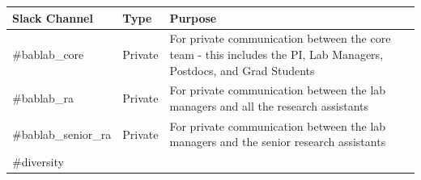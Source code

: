 \documentclass[]{book}
\begin{document}
\begin{longtable}[]{@{}lll@{}}
\toprule
\begin{minipage}[b]{0.18\columnwidth}\raggedright\strut
Slack Channel\strut
\end{minipage} & \begin{minipage}[b]{0.05\columnwidth}\raggedright\strut
Type\strut
\end{minipage} & \begin{minipage}[b]{0.69\columnwidth}\raggedright\strut
Purpose\strut
\end{minipage}\tabularnewline
\midrule
\endhead
\begin{minipage}[t]{0.18\columnwidth}\raggedright\strut
\#bablab\_core\strut
\end{minipage} & \begin{minipage}[t]{0.05\columnwidth}\raggedright\strut
Private\strut
\end{minipage} & \begin{minipage}[t]{0.69\columnwidth}\raggedright\strut
For private communication between the core team - this includes the PI,
Lab Managers, Postdocs, and Grad Students\strut
\end{minipage}\tabularnewline
\begin{minipage}[t]{0.18\columnwidth}\raggedright\strut
\#bablab\_ra\strut
\end{minipage} & \begin{minipage}[t]{0.05\columnwidth}\raggedright\strut
Private\strut
\end{minipage} & \begin{minipage}[t]{0.69\columnwidth}\raggedright\strut
For private communication between the lab managers and all the research
assistants\strut
\end{minipage}\tabularnewline
\begin{minipage}[t]{0.18\columnwidth}\raggedright\strut
\#bablab\_senior\_ra\strut
\end{minipage} & \begin{minipage}[t]{0.05\columnwidth}\raggedright\strut
Private\strut
\end{minipage} & \begin{minipage}[t]{0.69\columnwidth}\raggedright\strut
For private communication between the lab managers and the senior
research assistants\strut
\end{minipage}\tabularnewline
\begin{minipage}[t]{0.18\columnwidth}\raggedright\strut
\#diversity\strut
\end{minipage} & \begin{minipage}[t]{0.05\columnwidth}\raggedright\strut

\end{minipage}
\end{longtable}
\end{document}
